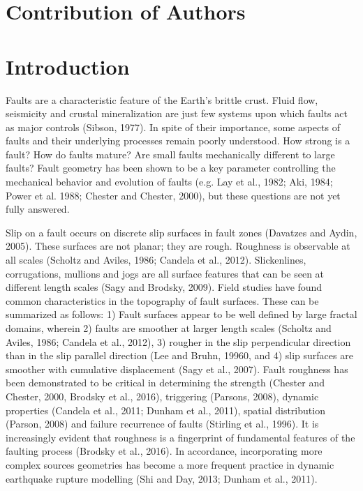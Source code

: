 \documentclass[12pt,a4paper]{article}
\begin{document}
\section*{Contribution of Authors}

\section{Introduction}

Faults are a characteristic feature of the Earth’s brittle crust. Fluid flow, seismicity and crustal mineralization are just few systems upon which faults act as major controls (Sibson, 1977). In spite of their importance, some aspects of faults and their underlying processes remain poorly understood. How strong is a fault? How do faults mature? Are small faults mechanically different to large faults? Fault geometry has been shown to be a key parameter controlling the mechanical behavior and evolution of faults (e.g. Lay et al., 1982; Aki, 1984; Power et al. 1988; Chester and Chester, 2000), but these questions are not yet fully answered.

Slip on a fault occurs on discrete slip surfaces in fault zones (Davatzes and Aydin, 2005). These surfaces are not planar; they are rough. Roughness is observable at all scales (Scholtz and Aviles, 1986; Candela et al., 2012). Slickenlines, corrugations, mullions and jogs are all  surface features that can be seen at different length scales (Sagy and Brodsky, 2009). Field studies have found common characteristics in the topography of fault surfaces. These can be summarized as follows: 1) Fault surfaces appear to be well defined by large fractal domains, wherein 2) faults are smoother at larger length scales (Scholtz and Aviles, 1986; Candela et al., 2012), 3) rougher in the slip perpendicular direction than in the slip parallel direction (Lee and Bruhn, 19960, and 4) slip surfaces are smoother with cumulative displacement (Sagy et al., 2007). Fault roughness has been demonstrated to be critical in determining the strength (Chester and Chester, 2000, Brodsky et al., 2016), triggering (Parsons, 2008), dynamic properties (Candela et al., 2011; Dunham et al., 2011), spatial distribution (Parson, 2008) and failure recurrence of faults (Stirling et al., 1996). It is increasingly evident that roughness is a fingerprint of fundamental features of the faulting process (Brodsky et al., 2016). In accordance, incorporating more complex sources geometries has become a more frequent practice in dynamic earthquake rupture modelling (Shi and Day, 2013; Dunham et al., 2011). 
\end{document}
